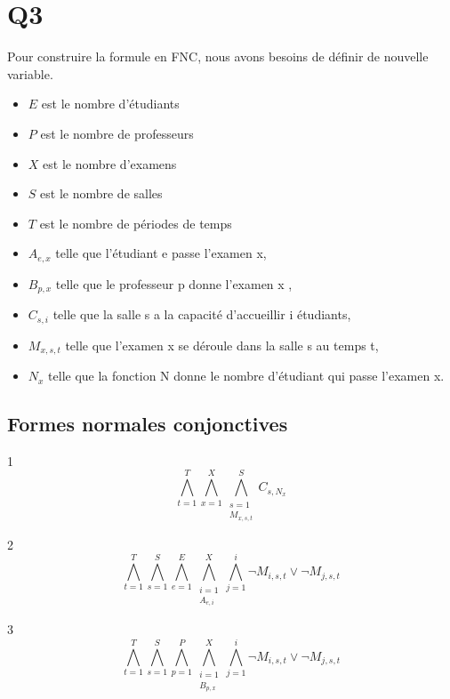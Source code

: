 \documentclass[a4paper,10pt]{article}
\begin{document}
\section{Q3}
Pour construire la formule en FNC, nous avons besoins de définir de nouvelle variable.
\begin{itemize}
    \item \(E\) est le nombre d'étudiants
    \item \(P\) est le nombre de professeurs
    \item \(X\) est le nombre d'examens
    \item \(S\) est le nombre de salles
    \item \(T\) est le nombre de périodes de temps
	\item \( A_{e,x}\) telle que l'étudiant e passe l'examen x,
	\item \(B_{p,x}\) telle que le professeur p donne l'examen x ,
	\item \(C_{s,i}\) telle que la salle s a la capacité d'accueillir i étudiants,
	\item \(M_{x,s,t}\) telle que l'examen x se déroule dans la salle s au temps t,
	\item \(N_{x}\) telle que la fonction N donne le nombre d'étudiant qui passe l'examen x.
\end{itemize}


\subsection{Formes normales conjonctives}
1
\begin{displaymath}
	\bigwedge\limits_{t=1}^{T}\bigwedge\limits_{x=1}^{X}\bigwedge\limits_{\substack{s=1 \\ M_{x,s,t}}}^{S} C_{s,N_{x}}
\end{displaymath}

2
\begin{displaymath}
\bigwedge\limits_{t=1}^{T}\bigwedge\limits_{s=1}^{S}\bigwedge\limits_{e=1}^{E}\bigwedge\limits_{\substack{i=1 \\ A_{e,i}}}^{X}\bigwedge\limits_{j=1}^{i} \neg M_{i, s, t} \vee \neg M_{j, s, t}
\end{displaymath}

3
\begin{displaymath}
\bigwedge\limits_{t=1}^{T}\bigwedge\limits_{s=1}^{S}\bigwedge\limits_{p=1}^{P}\bigwedge\limits_{\substack{i=1 \\ B_{p,x}}}^{X}\bigwedge\limits_{j=1}^{i} \neg M_{i, s, t} \vee \neg M_{j, s, t}
\end{displaymath}
\end{document}
